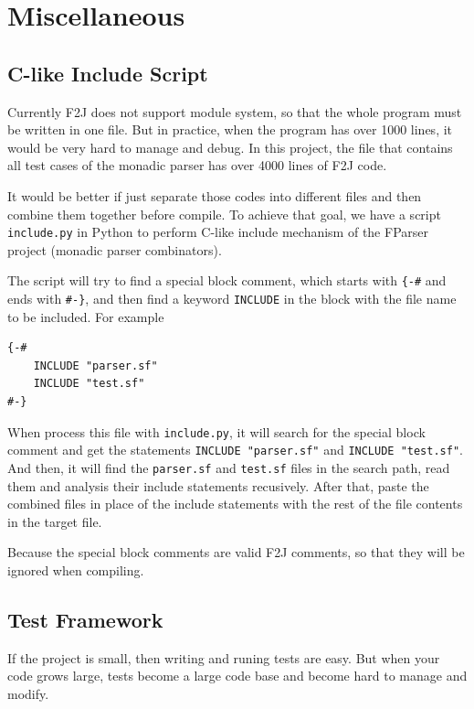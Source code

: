 \chapter{Miscellaneous}

\section{C-like Include Script}

Currently F2J does not support module system, so that the whole program must be written in one file. But in practice, when the program has over 1000 lines, it would be very hard to manage and debug. In this project, the file that contains all test cases of the monadic parser has over 4000 lines of F2J code.

It would be better if just separate those codes into different files and then combine them together before compile. To achieve that goal, we have a script \texttt{include.py} in Python to perform C-like include mechanism of the FParser project (monadic parser combinators).

The script will try to find a special block comment, which starts with \texttt{\{-\#} and ends with \texttt{\#-\}}, and then find a keyword \texttt{INCLUDE} in the block with the file name to be included. For example

\begin{lstlisting}
{-#
    INCLUDE "parser.sf"
    INCLUDE "test.sf"
#-}
\end{lstlisting}

When process this file with \texttt{include.py}, it will search for the special block comment and get the statements \texttt{INCLUDE "parser.sf"} and \texttt{INCLUDE "test.sf"}. And then, it will find the \texttt{parser.sf} and \texttt{test.sf} files in the search path, read them and analysis their include statements recusively. After that, paste the combined files in place of the include statements with the rest of the file contents in the target file.

Because the special block comments are valid F2J comments, so that they will be ignored when compiling.

\section{Test Framework}

If the project is small, then writing and runing tests are easy. But when your code grows large, tests become a large code base and become hard to manage and modify.

